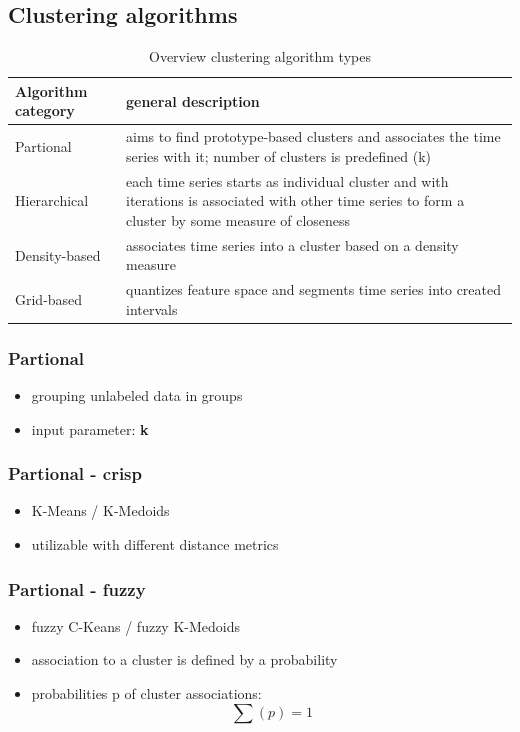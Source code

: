 \documentclass[11pt]{article}
\begin{document}
\subsection*{Clustering algorithms}
\label{sec:org1b513c7}
\begin{table}[htbp]
\caption{\label{tab:org8b6b37d}Overview clustering algorithm types}
\centering
\begin{tabularx}{\columnwidth}{|l|X|}
\hline
Algorithm category & general description\\
\hline
Partional & aims to find prototype-based clusters and associates the time series with it; number of clusters is predefined (k)\\
\hline
Hierarchical & each time series starts as individual cluster and with iterations is associated with other time series to form a cluster by some measure of closeness\\
\hline
Density-based & associates time series into a cluster based on a density measure\\
\hline
Grid-based & quantizes feature space and segments time series into created intervals\\
\hline
\end{tabularx}
\end{table}

\subsubsection*{Partional}
\label{sec:org3ef80eb}
\begin{itemize}
\item grouping unlabeled data in groups
\item input parameter: \textbf{k}
\end{itemize}
\subsubsection*{Partional - crisp}
\label{sec:org98664df}
\begin{itemize}
\item K-Means / K-Medoids
\item utilizable with different distance metrics
\end{itemize}
\subsubsection*{Partional - fuzzy}
\label{sec:orgf88d424}
\begin{itemize}
\item fuzzy C-Keans / fuzzy K-Medoids
\item association to a cluster is defined by a probability
\item probabilities p of cluster associations:
$$ \sum{(p) = 1} $$
\end{itemize}
\end{document}

